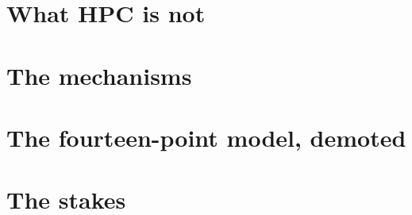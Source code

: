 \section{What HPC is not}

%
%

\section{The mechanisms}

%
%

\section{The fourteen-point model, demoted}

%
%

\section{The stakes}

%
%
